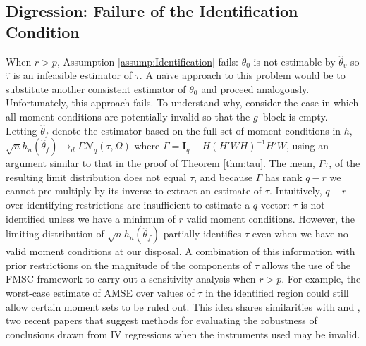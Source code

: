 \subsection{Digression: Failure of the Identification Condition}
\label{subsec:digress}
When $r > p$, Assumption \ref{assump:Identification} fails: $\theta_0$ is not estimable by $\widehat{\theta}_v$ so $\widehat{\tau}$ is an infeasible estimator of $\tau$. 
A na\"{i}ve approach to this problem would be to substitute another consistent estimator of $\theta_0$ and proceed analogously. 
Unfortunately, this approach fails. To understand why, consider the case in which all moment conditions are potentially invalid so that the $g$--block is empty. 
Letting $\widehat{\theta}_f$ denote the estimator based on the full set of moment conditions in $h$,  $\sqrt{n}h_n(\widehat{\theta}_f) \rightarrow_d\Gamma  \mathcal{N}_q(\tau, \Omega)$ where $\Gamma = \mathbf{I}_q - H \left(H'WH\right)^{-1}H'W$, using an argument similar to that in the proof of Theorem \ref{thm:tau}. 
The mean, $\Gamma \tau$, of the resulting limit distribution does not equal $\tau$, and because $\Gamma$ has rank $q-r$ we cannot pre-multiply by its inverse to extract an estimate of $\tau$.
Intuitively, $q-r$ over-identifying restrictions are insufficient to estimate a $q$-vector: $\tau$ is not identified unless we have a minimum of $r$ valid moment conditions. 
However, the limiting distribution of $\sqrt{n}h_n(\widehat{\theta}_f)$ partially identifies $\tau$ even when we have no valid moment conditions at our disposal. 
A combination of this information with prior restrictions on the magnitude of the components of $\tau$ allows the use of the FMSC framework to carry out a sensitivity analysis when $r>p$. 
For example, the worst-case estimate of AMSE over values of $\tau$ in the identified region could still allow certain moment sets to be ruled out.
This idea shares similarities with \citet{Kraay} and \citet{Conleyetal}, two recent papers that suggest methods for evaluating the robustness of conclusions drawn from IV regressions when the instruments used may be invalid.